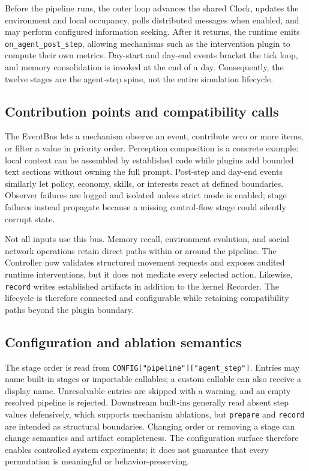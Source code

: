 Before the pipeline runs, the outer loop advances the shared Clock, updates the
environment and local occupancy, polls distributed messages when enabled, and
may perform configured information seeking.  After it returns, the runtime
emits \texttt{on\_agent\_post\_step}, allowing mechanisms such as the
intervention plugin to compute their own metrics.  Day-start and day-end
events bracket the tick loop, and memory consolidation is invoked at the end
of a day.  Consequently, the twelve stages are the agent-step spine, not the
entire simulation lifecycle.

\subsection{Contribution points and compatibility calls}

The EventBus lets a mechanism observe an event, contribute zero or more items,
or filter a value in priority order.  Perception composition is a concrete
example: local context can be assembled by established code while plugins add
bounded text sections without owning the full prompt.  Post-step and day-end
events similarly let policy, economy, skills, or interests react at defined
boundaries.  Observer failures are logged and isolated unless strict mode is
enabled; stage failures instead propagate because a missing control-flow stage
could silently corrupt state.

Not all inputs use this bus.  Memory recall, environment evolution, and social
network operations retain direct paths within or around the pipeline.  The
Controller now validates structured movement requests and exposes audited
runtime interventions, but it does not mediate every selected action.
Likewise, \texttt{record} writes established artifacts in addition to the
kernel Recorder.  The lifecycle is therefore connected and configurable while
retaining compatibility paths beyond the plugin boundary.

\subsection{Configuration and ablation semantics}

The stage order is read from \texttt{CONFIG["pipeline"]["agent\_step"]}.
Entries may name built-in stages or importable callables; a custom callable can
also receive a display name.  Unresolvable entries are skipped with a warning,
and an empty resolved pipeline is rejected.  Downstream built-ins generally
read absent step values defensively, which supports mechanism ablations, but
\texttt{prepare} and \texttt{record} are intended as structural boundaries.
Changing order or removing a stage can change semantics and artifact
completeness.  The configuration surface therefore enables controlled system
experiments; it does not guarantee that every permutation is meaningful or
behavior-preserving.
